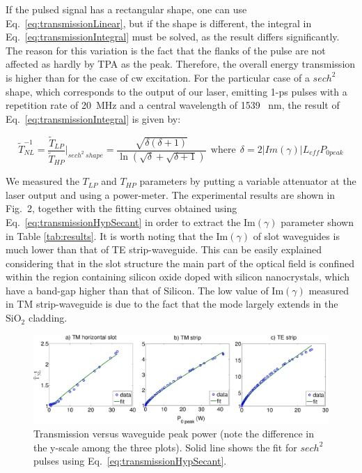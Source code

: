 \documentclass[10pt,letterpaper]{article}
\begin{document}
If the pulsed signal has a rectangular shape, one can use Eq.~\ref{eq:transmissionLinear}, but if the shape is different, the integral in Eq.~\ref{eq:transmissionIntegral} must be solved, as the result differs significantly. The reason for this variation is the fact that the flanks of the pulse are not affected as hardly by TPA as the peak. Therefore, the overall energy transmission is higher than for the case of cw excitation. For the particular case of a $sech^2$ shape, which corresponds to the output of our laser, emitting 1-ps pulses with a repetition rate of 20~MHz and a central wavelength of 1539~ nm, the result of  Eq.~\ref{eq:transmissionIntegral} is given by:


                                                                \begin{equation}
                                                                        \tilde{T}_{NL}^{-1}  = \frac{\tilde{T}_{LP}}{\tilde{T}_{HP}} \bigg|_{sech^2~shape}  = \frac{\sqrt{\delta({\delta + 1})}}{\ln(\sqrt{\delta}+\sqrt{\delta+1})} ~~\mathrm{where}~~  \delta = 2|Im(\gamma)| L_{eff} P_{0 peak}
                                                                        \label{eq:transmissionHypSecant}
                                                                \end{equation}


We measured the $T_{LP}$ and $T_{HP}$ parameters by putting a variable attenuator at the laser output and using a power-meter. The experimental results are shown in Fig.~2, together with the fitting curves obtained using Eq.~\ref{eq:transmissionHypSecant} in order to extract the Im$(\gamma)$ parameter shown in Table \ref{tab:results}. 
It is worth noting that the Im$(\gamma )$ of slot waveguides is much lower than that of TE strip-waveguide. This can be easily explained considering that in the slot structure the main part of the optical field is confined within the region containing silicon oxide doped with silicon nanocrystals, which have a band-gap higher than that of Silicon. The low value of Im$(\gamma)$ measured in TM strip-waveguide is due to the fact that  the mode largely extends in the $\mathrm{SiO_2}$ cladding. 



\begin{figure}[htb]
    \centering
    \includegraphics[width=1.0\textwidth]{imGamma_slot_TM_TE_v6}
     \caption{Transmission versus waveguide peak power (note the difference in the y-scale among the three plots). Solid line shows the fit for $ sech^2 $ pulses using Eq.~\ref{eq:transmissionHypSecant}.}
    \label{fig:imGammaSamples}
\end{figure}
\end{document}
